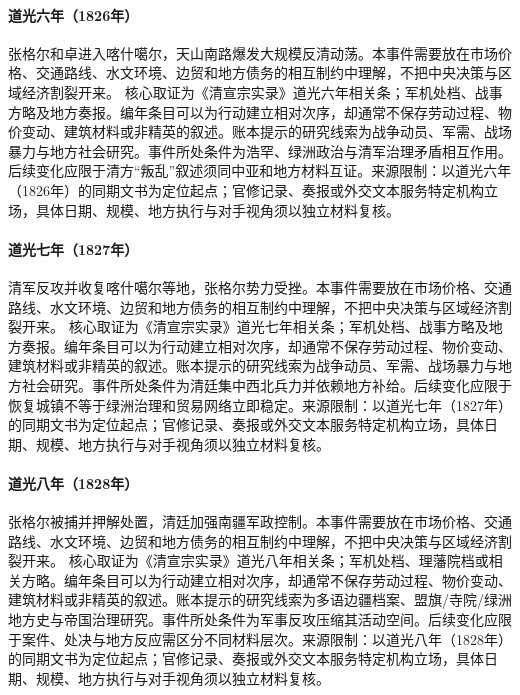 \hypertarget{civic:EQ-1826-JAHANGIR-KHOJA-UPRISING}{}\paragraph{道光六年（1826年）}张格尔和卓进入喀什噶尔，天山南路爆发大规模反清动荡。本事件需要放在市场价格、交通路线、水文环境、边贸和地方债务的相互制约中理解，不把中央决策与区域经济割裂开来。 核心取证为《清宣宗实录》道光六年相关条；军机处档、战事方略及地方奏报。编年条目可以为行动建立相对次序，却通常不保存劳动过程、物价变动、建筑材料或非精英的叙述。账本提示的研究线索为战争动员、军需、战场暴力与地方社会研究。事件所处条件为浩罕、绿洲政治与清军治理矛盾相互作用。后续变化应限于清方“叛乱”叙述须同中亚和地方材料互证。来源限制：以道光六年（1826年）的同期文书为定位起点；官修记录、奏报或外交文本服务特定机构立场，具体日期、规模、地方执行与对手视角须以独立材料复核。
\hypertarget{civic:EQ-1827-KASHGAR-RECOVERY}{}\paragraph{道光七年（1827年）}清军反攻并收复喀什噶尔等地，张格尔势力受挫。本事件需要放在市场价格、交通路线、水文环境、边贸和地方债务的相互制约中理解，不把中央决策与区域经济割裂开来。 核心取证为《清宣宗实录》道光七年相关条；军机处档、战事方略及地方奏报。编年条目可以为行动建立相对次序，却通常不保存劳动过程、物价变动、建筑材料或非精英的叙述。账本提示的研究线索为战争动员、军需、战场暴力与地方社会研究。事件所处条件为清廷集中西北兵力并依赖地方补给。后续变化应限于恢复城镇不等于绿洲治理和贸易网络立即稳定。来源限制：以道光七年（1827年）的同期文书为定位起点；官修记录、奏报或外交文本服务特定机构立场，具体日期、规模、地方执行与对手视角须以独立材料复核。
\hypertarget{civic:EQ-1828-JAHANGIR-CAPTURE}{}\paragraph{道光八年（1828年）}张格尔被捕并押解处置，清廷加强南疆军政控制。本事件需要放在市场价格、交通路线、水文环境、边贸和地方债务的相互制约中理解，不把中央决策与区域经济割裂开来。 核心取证为《清宣宗实录》道光八年相关条；军机处档、理藩院档或相关方略。编年条目可以为行动建立相对次序，却通常不保存劳动过程、物价变动、建筑材料或非精英的叙述。账本提示的研究线索为多语边疆档案、盟旗/寺院/绿洲地方史与帝国治理研究。事件所处条件为军事反攻压缩其活动空间。后续变化应限于案件、处决与地方反应需区分不同材料层次。来源限制：以道光八年（1828年）的同期文书为定位起点；官修记录、奏报或外交文本服务特定机构立场，具体日期、规模、地方执行与对手视角须以独立材料复核。
